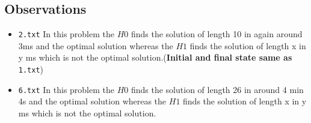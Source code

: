 \documentclass{article}
\begin{document}
\subsection{Observations}
\begin{itemize}
\item \verb|2.txt| In this problem the $H0$ finds the solution of length 10 in again around 3ms and the optimal solution whereas the $H1$ finds the solution of length x in y ms which is not the optimal solution.(\textbf{Initial and final state same as} \verb|1.txt|)

\item \verb|6.txt| In this problem the $H0$ finds the solution of length 26 in around 4 min 4s and the optimal solution whereas the $H1$ finds the solution of length x in y ms which is not the optimal solution.


\end{itemize}
\end{document}
